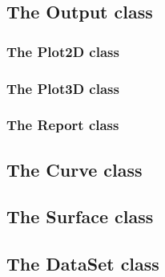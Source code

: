 
\subsection[Output]{The Output class}


\subsubsection[Plot2D]{The Plot2D class}


\subsubsection[Plot3D]{The Plot3D class}


\subsubsection[Report]{The Report class}


\subsection[Curve]{The Curve class}


\newpage
\subsection[Surface]{The Surface class}


\newpage
\subsection[DataSet]{The DataSet class}


